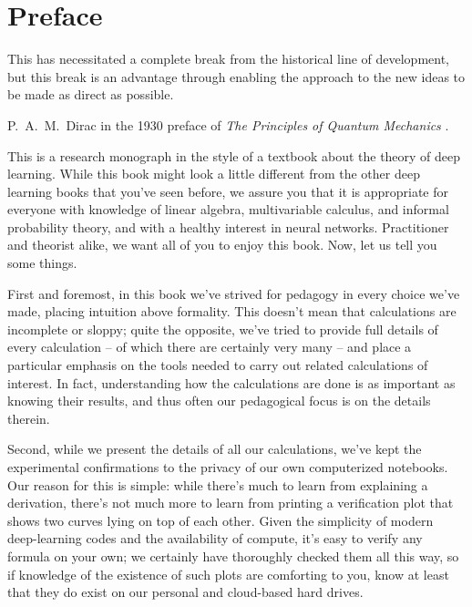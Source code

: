 



\chapter{Preface}\label{sec:meta-learning}
\epigraph{This has necessitated a complete break from the historical line of development, but this break is an advantage through enabling the approach to the new ideas to be made as direct as possible.}{P.~A.~M.~Dirac in the 1930 preface of \emph{The Principles of Quantum Mechanics} \cite{dirac1930principles}.}














\noindent{}This is a research monograph in the style of a textbook about the theory of deep learning. While this book might look a little different from the other deep learning books that you've seen before, we assure you that it is appropriate for everyone with knowledge of linear algebra, multivariable calculus, and informal probability theory, and with a healthy interest in neural networks.
Practitioner and theorist alike, we want all of you to enjoy this book.
Now, let us tell you some things. %





First and foremost, in this book we've strived for pedagogy in every choice we've made, placing intuition above formality. 
This doesn't mean that calculations are incomplete or sloppy; quite the opposite, we've tried to provide full details of every calculation -- of which there are certainly very many -- and place a particular emphasis on the tools needed to carry out related calculations of interest. In fact, understanding how the calculations are done is as important as knowing their results, and thus often our pedagogical focus is on the details therein.









Second, while we present the details of all our calculations, we've kept the experimental confirmations to the privacy of our own computerized notebooks. 
Our reason for this is simple: while there's much to learn from explaining a derivation, there's  not much more to learn from printing a verification plot that shows two curves lying on top of each other.  Given the simplicity of modern deep-learning codes and the availability of compute, it's easy to verify any formula on your own; we certainly have thoroughly checked them all this way, so if knowledge of the existence of such plots are comforting to you, know at least that they do exist on our personal and cloud-based hard drives. %







